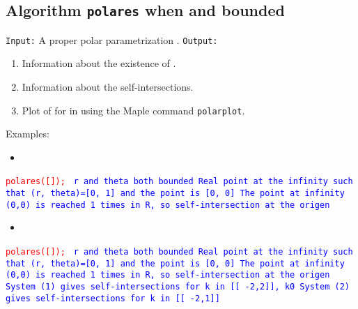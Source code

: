 \documentclass{elsart}
\begin{document}
\subsection{Algorithm {\tt polares} when  and  bounded}

{\tt Input:} A proper polar parametrization . \newline
{\tt Output:}
 \begin{enumerate}
  \item Information about the existence of .
  \item Information about the self-intersections.
  \item Plot  of  for  in  using the Maple command \texttt{polarplot}.
\end{enumerate}

Examples:

\begin{itemize}
  \item 
\end{itemize}

\texttt{\textcolor{red}{polares([]);}}\newline
\texttt{\textcolor{blue}{
 r and theta both bounded \newline
 Real point at the infinity such that (r, theta)=[0, 1] and the point is [0, 0] \newline
The point at infinity (0,0) is reached 1 times in R, so self-intersection at the origen}}

\begin{figure}[ht]
\begin{center}
\centerline{  }
\end{center}
\caption{}\end{figure}
\begin{itemize}
  \item 
  \end{itemize}


  \texttt{\textcolor{red}{polares([]);}}\newline
\texttt{\textcolor{blue}{  r and theta both bounded \newline
Real point at the infinity such that (r, theta)=[0, 1] and the point is [0, 0] \newline
The point at infinity (0,0) is reached 1 times in R, so self-intersection at the origen \newline
System (1) gives self-intersections for  k in [[ -2,2]], k0\newline
System (2) gives self-intersections for k in [[ -2,1]]}}
\end{document}
